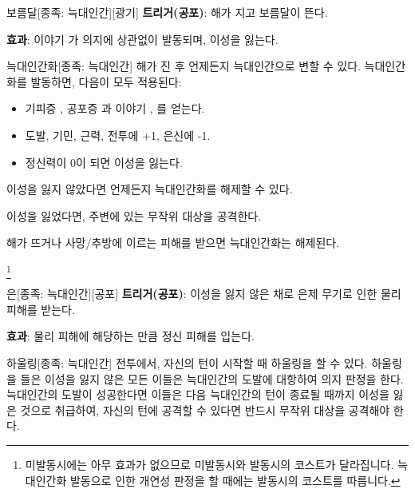 \documentclass{report}
\begin{document}
	\begin{story}{보름달}{[종족: 늑대인간][광기]}
		\textbf{트리거(공포)}: 해가 지고 보름달이 뜬다.
		
		\textbf{효과}: 이야기 가 의지에 상관없이 발동되며, 이성을 잃는다.
		
		\smallskip
		
	\end{story}
	
	\begin{story}{늑대인간화}{[종족: 늑대인간]}
		해가 진 후 언제든지 늑대인간으로 변할 수 있다. 늑대인간화를 발동하면, 다음이 모두 적용된다:
		\begin{itemize}
			\item 기피증 , 공포증 과 이야기 , 를 얻는다.
			\item 도발, 기민, 근력, 전투에 +1, 은신에 -1.
			\item 정신력이 0이 되면 이성을 잃는다.
		\end{itemize}
		
		이성을 잃지 않았다면 언제든지 늑대인간화를 해제할 수 있다.
		
		이성을 잃었다면, 주변에 있는 무작위 대상을 공격한다.
		
		\smallskip
		
		해가 뜨거나 사망/추방에 이르는 피해를 받으면 늑대인간화는 해제된다.
		
		\smallskip
		
		\footnote{미발동시에는 아무 효과가 없으므로 미발동시와 발동시의 코스트가 달라집니다. 늑대인간화 발동으로 인한 개연성 판정을 할 때에는 발동시의 코스트를 따릅니다.}
	\end{story}
	
	\begin{story}{은}{[종족: 늑대인간][공포]}
		\textbf{트리거(공포)}: 이성을 잃지 않은 채로 은제 무기로 인한 물리 피해를 받는다.
		
		\textbf{효과}: 물리 피해에 해당하는 만큼 정신 피해를 입는다.
		
		\smallskip
		
	\end{story}
	
	\begin{story}{하울링}{[종족: 늑대인간]}
		전투에서, 자신의 턴이 시작할 때 하울링을 할 수 있다. 하울링을 들은 이성을 잃지 않은 모든 이들은 늑대인간의 도발에 대항하여 의지 판정을 한다. 늑대인간의 도발이 성공한다면 이들은 다음 늑대인간의 턴이 종료될 때까지 이성을 잃은 것으로 취급하여, 자신의 턴에 공격할 수 있다면 반드시 무작위 대상을 공격해야 한다.
		
		\smallskip
		
	\end{story}
	
\end{document}
